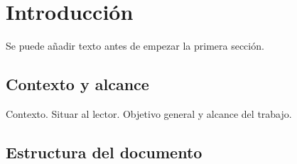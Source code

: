 \documentclass[12pt,twoside,titlepage]{report}
\begin{document}







\pagestyle{fancy}


\renewcommand{\chaptermark}[1]{\markboth{Capítulo \thechapter.\ #1}{}}

\pagestyle{fancy}
\fancyhf{}
\fancyhead[LO]{\leftmark}
\fancyhead[RO]{}
\fancyhead[RE]{\nouppercase\rightmark}
\fancyhead[LE]{}
\fancyfoot[C]{\thepage}










\chapter{Introducción}



\pagestyle{fancy}


\setlength{\parskip}{0.75em}
\renewcommand{\baselinestretch}{1.25}
\setcounter{page}{1}




Se puede añadir texto antes de empezar la primera sección.


\section{Contexto y alcance}

Contexto. Situar al lector. Objetivo general y alcance del trabajo.


\section{Estructura del documento}
\end{document}
